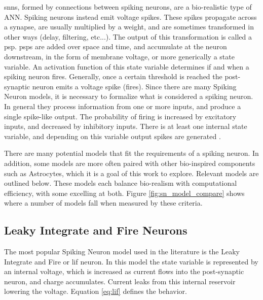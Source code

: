     \Glspl{snn}, formed by connections between spiking neurons, are a bio-realistic
    type of ANN. Spiking neurons instead emit voltage spikes. These spikes
    propagate across a synapse, are usually multiplied by a weight, and are
    sometimes transformed in other ways (delay, filtering, etc...). The output
    of this transformation is called a \Gls{psp}. \Glspl{psp} are
    added over space and time, and accumulate at the neuron downstream, in the
    form of membrane voltage, or more generically a state variable. An
    activation function of this state variable determines if and when a spiking
    neuron fires. Generally, once a certain threshold is reached the
    post-synaptic neuron emits a voltage spike (fires). Since there are many
    Spiking Neuron models, it is necessary to formalize what is considered a
    spiking neuron. In general they process information from one or more inputs,
    and produce a single spike-like output. The probability of firing is
    increased by excitatory inputs, and decreased by inhibitory inputs. There is
    at least one internal state variable, and depending on this variable output
    spikes are generated \cite{ponulak_2011}.
    
    There are many potential models that fit the requirements of a spiking
    neuron. In addition, some models are more often paired with other
    bio-inspired components such as Astrocytes, which it is a goal of this work
    to explore. Relevant models are outlined below. These models each balance
    bio-realism with computational efficiency, with some excelling at
    both. Figure \ref{fig:sn_model_compare} shows where a number of models fall
    when measured by these criteria.
    

    \subsection{Leaky Integrate and Fire Neurons}
    The most popular Spiking Neuron model used in the literature is the
    Leaky Integrate and Fire or \Gls{lif} neuron. In this model the state variable is
    represented by an internal voltage, which is increased as current flows into
    the post-synaptic neuron, and charge accumulates. Current leaks from this
    internal reservoir lowering the voltage. Equation \ref{eq:lif} defines the
    behavior.

